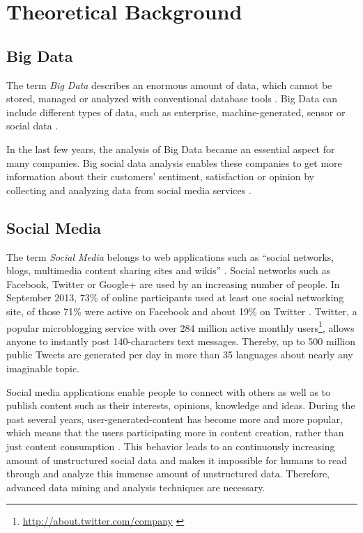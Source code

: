 
\chapter{Theoretical Background}
\label{cha:background}

\section{Big Data}
\label{sec:big-data}
The term \textit{Big Data} describes an enormous amount of data, which cannot be stored, managed or analyzed with conventional database tools \cite{web2011linkeddata}. Big Data can include different types of data, such as enterprise, machine-generated, sensor or social data \cite[3]{oraclebigdata}.

In the last few years, the analysis of Big Data became an essential aspect for many companies. Big social data analysis enables these companies to get more information about their customers' sentiment, satisfaction or opinion by collecting and analyzing data from social media services \cite{oraclebigdata}.

\section{Social Media}
\label{sec:social-media}
The term \textit{Social Media} belongs to web applications such as \enquote{social networks, blogs, multimedia content sharing sites and wikis} \cite{eu2013socialmedia}. Social networks such as Facebook, Twitter or Google+ are used by an increasing number of people. In September 2013, 73\% of online participants used at least one social networking site, of those 71\% were active on Facebook and about 19\% on Twitter \cite{pewresearchsocialmediafact}. Twitter, a popular microblogging service with over 284 million active monthly users\footnote{\url{http://about.twitter.com/company} \accessednote \label{aboutwitter}}, allows anyone to instantly post 140-characters text messages. Thereby, up to 500 million public Tweets are generated per day in more than 35 languages about nearly any imaginable topic. 

Social media applications enable people to connect with others as well as to publish content such as their interests, opinions, knowledge and ideas. During the past several years, user-generated-content has become more and more popular, which means that the users participating more in content creation, rather than just content consumption \cite[1]{Agichtein:2008:FHC:1341531.1341557}. This behavior leads to an continuously increasing amount of unstructured social data and makes it impossible for humans to read through and analyze this immense amount of unstructured data. Therefore, advanced data mining and analysis techniques are necessary.

